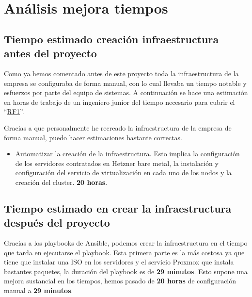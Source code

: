 \section{Análisis mejora tiempos}
\label{analisis_tiempos} 
\subsection{Tiempo estimado creación infraestructura antes del proyecto}
\begin{text}
        Como ya hemos comentado antes de este proyecto toda la infraestructura de la empresa se configuraba de forma manual, con lo cual llevaba un tiempo notable y esfuerzos por parte del equipo de sistemas. A continuación se hace una estimación en horas de trabajo de un ingeniero junior del tiempo necesario para cubrir el ``\hyperref[RF1]{RF1}''.

        Gracias a que personalmente he recreado la infraestructura de la empresa de forma manual, puedo hacer estimaciones bastante correctas.

        \begin{itemize}
                \item Automatizar la creación de la infraestructura. Esto implica la configuración de los servidores contratados en Hetzner bare metal, la instalación y configuración del servicio de virtualización en cada uno de los nodos y la creación del cluster.  \textbf{20 horas}.
        \end{itemize}

\end{text}

\subsection{Tiempo estimado en crear la infraestructura después del proyecto}
\begin{text}
        Gracias a los playbooks de Ansible, podemos crear la infraestructura en el tiempo que tarda en ejecutarse el playbook. Esta primera parte es la más costosa ya que tiene que instalar una ISO en los servidores y el servicio Proxmox que instala bastantes paquetes, la duración del playbook es de \textbf{29 minutos}. Esto supone una mejora sustancial en los tiempos, hemos pasado de \textbf{20 horas} de configuración manual a \textbf{29 minutos}.
\end{text}


